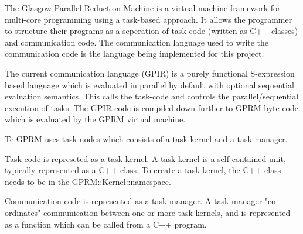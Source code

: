 The Glasgow Parallel Reduction Machine is a virtual machine framework for multi-core programming using a task-based approach. It allows the programmer to structure their programs as a seperation of task-code (written as C++ classes) and communication code. The communication language used to write the communication code is the language being implemented for this project.

The current communication language (GPIR) is a purely functional S-expression based language which is evaluated in parallel by default with optional sequential
evaluation semantics. This calls the task-code and controls the parallel/sequential execution of tasks. The GPIR code is compiled down further
to GPRM byte-code which is evaluated by the GPRM virtual machine.

Te GPRM uses task nodes which consists of a task kernel and a task manager.

Task code is represeted as a task kernel. A task kernel is a self contained unit, typically represented as a C++ class.
To create a task kernel, the C++ class needs to be in the GPRM::Kernel::namespace.

Communication code is represented as a task manager. A task manager "co-ordinates" communication between one or more task kernels, and
is represented as a function which can be called from a C++ program.


